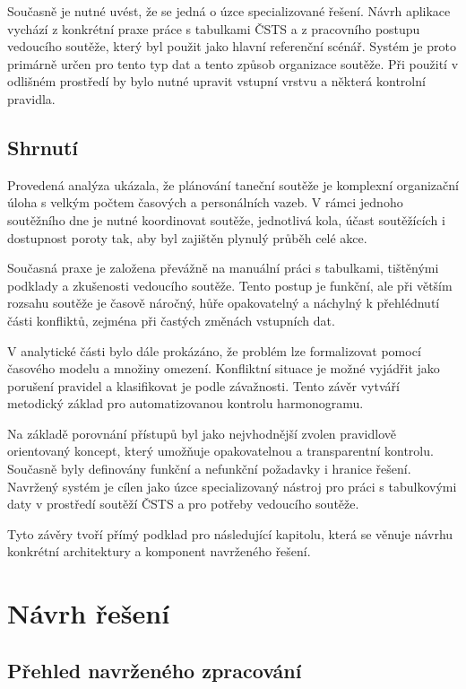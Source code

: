 \documentclass[czech, kiv, ba, he, iso690alph, pdf]{fasthesis}
\begin{document}
				Současně je nutné uvést, že se jedná o úzce specializované řešení. Návrh aplikace vychází z konkrétní praxe práce s tabulkami ČSTS a z pracovního postupu vedoucího soutěže, který byl použit jako hlavní referenční scénář. Systém je proto primárně určen pro tento typ dat a tento způsob organizace soutěže. Při použití v odlišném prostředí by bylo nutné upravit vstupní vrstvu a některá kontrolní pravidla.
	
	
		\section{Shrnutí}
			Provedená analýza ukázala, že plánování taneční soutěže je komplexní organizační úloha s velkým počtem časových a personálních vazeb. V rámci jednoho soutěžního dne je nutné koordinovat soutěže, jednotlivá kola, účast soutěžících i dostupnost poroty tak, aby byl zajištěn plynulý průběh celé akce.
		
			Současná praxe je založena převážně na manuální práci s tabulkami, tištěnými podklady a zkušenosti vedoucího soutěže. Tento postup je funkční, ale při větším rozsahu soutěže je časově náročný, hůře opakovatelný a náchylný k přehlédnutí části konfliktů, zejména při častých změnách vstupních dat.
		
			V analytické části bylo dále prokázáno, že problém lze formalizovat pomocí časového modelu a množiny omezení. Konfliktní situace je možné vyjádřit jako porušení pravidel a klasifikovat je podle závažnosti. Tento závěr vytváří metodický základ pro automatizovanou kontrolu harmonogramu.
		
			Na základě porovnání přístupů byl jako nejvhodnější zvolen pravidlově orientovaný koncept, který umožňuje opakovatelnou a transparentní kontrolu. Současně byly definovány funkční a nefunkční požadavky i hranice řešení. Navržený systém je cílen jako úzce specializovaný nástroj pro práci s tabulkovými daty v prostředí soutěží ČSTS a pro potřeby vedoucího soutěže.
		
			Tyto závěry tvoří přímý podklad pro následující kapitolu, která se věnuje návrhu konkrétní architektury a komponent navrženého řešení.
	
	\chapter{Návrh řešení}
	
		\section{Přehled navrženého zpracování}
	
\end{document}

